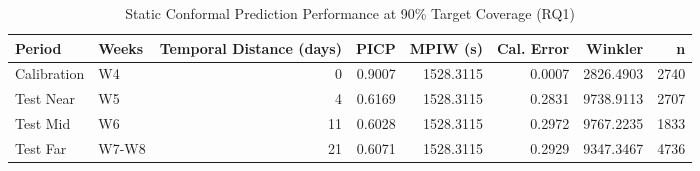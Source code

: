 \begin{table}
\caption{Static Conformal Prediction Performance at 90\% Target Coverage (RQ1)}
\label{tab:t4_1_static_cp_90}
\begin{tabular}{llrrrrrr}
\toprule
Period & Weeks & Temporal Distance (days) & PICP & MPIW (s) & Cal. Error & Winkler & n \\
\midrule
Calibration & W4 & 0 & 0.9007 & 1528.3115 & 0.0007 & 2826.4903 & 2740 \\
Test Near & W5 & 4 & 0.6169 & 1528.3115 & 0.2831 & 9738.9113 & 2707 \\
Test Mid & W6 & 11 & 0.6028 & 1528.3115 & 0.2972 & 9767.2235 & 1833 \\
Test Far & W7-W8 & 21 & 0.6071 & 1528.3115 & 0.2929 & 9347.3467 & 4736 \\
\bottomrule
\end{tabular}
\end{table}
